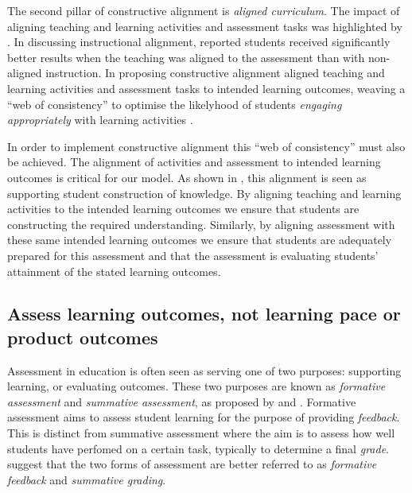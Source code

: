 The second pillar of constructive alignment is \emph{aligned curriculum}. The impact of aligning teaching and learning activities and assessment tasks was highlighted by \citet{Cohen:1987}. In discussing instructional alignment, \citet{Cohen:1987} reported students received significantly better results when the teaching was aligned to the assessment than with non-aligned instruction. In proposing constructive alignment \citet{Biggs:1996c} aligned teaching and learning activities and assessment tasks to intended learning outcomes, weaving a ``web of consistency'' to optimise the likelyhood of students \emph{engaging appropriately} with learning activities \cite{Biggs:1999}. 

In order to implement constructive alignment this ``web of consistency'' must also be achieved. The alignment of activities and assessment to intended learning outcomes is critical for our model. As shown in , this alignment is seen as supporting student construction of knowledge. By aligning teaching and learning activities to the intended learning outcomes we ensure that students are constructing the required understanding. Similarly, by aligning assessment with these same intended learning outcomes we ensure that students are adequately prepared for this assessment and that the assessment is evaluating students' attainment of the stated learning outcomes. 



\subsection{Assess learning outcomes, not learning pace or product outcomes} %
\label{ssub:aim_to_assess_learning_outcomes_not_learning_pace_or_product_outcomes_}

Assessment in education is often seen as serving one of two purposes: supporting learning, or evaluating outcomes. These two purposes are known as \emph{formative assessment} and \emph{summative assessment}, as proposed by \citet{Scriven:1967} and \citet{Bloom:1969}. Formative assessment aims to assess student learning for the purpose of providing \emph{feedback}. This is distinct from summative assessment where the aim is to assess how well students have perfomed on a certain task, typically to determine a final \emph{grade}. \citet{Biggs:2007} suggest that the two forms of assessment are better referred to as \emph{formative feedback} and \emph{summative grading}.

